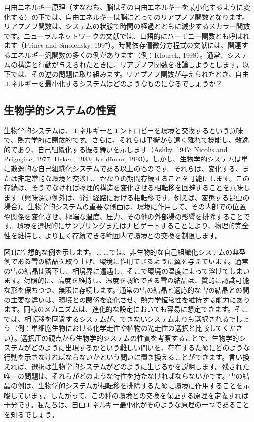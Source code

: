\documentclass{article}
\begin{document}
自由エネルギー原理（すなわち、脳はその自由エネルギーを最小化するように変化する）の下では、自由エネルギーは脳にとってのリアプノフ関数となります。リアプノフ関数は、システムの状態で時間の経過とともに減少するスカラー関数です。ニューラルネットワークの文献では、口語的にハーモニー関数とも呼ばれます（Prince and Smolensky, 1997）。時間依存偏微分方程式の文献には、関連するエネルギー汎関数の多くの例があります（例：Kloucek, 1998）。通常、システムの構造と行動が与えられたときに、リアプノフ関数を推論しようとします。以下では、その逆の問題に取り組みます。リアプノフ関数が与えられたとき、自由エネルギーを最小化するシステムはどのようなものになるでしょうか？

\subsection{生物学的システムの性質}
生物学的システムは、エネルギーとエントロピーを環境と交換するという意味で、熱力学的に開放的です。さらに、それらは平衡から遠く離れて機能し、散逸的であり、自己組織化する振る舞いを示します（Ashby, 1947; Nicolis and Prigogine, 1977; Haken, 1983; Kauffman, 1993）。しかし、生物学的システムは単に散逸的な自己組織化システムである以上のものです。それらは、変化する、または非定常的な環境と交渉し、かなりの期間存続することを可能にします。この存続は、そうでなければ物理的構造を変化させる相転移を回避することを意味します（興味深い例外は、発達経路における相転移です。例えば、変態する昆虫の場合）。生物学的システムの重要な側面は、環境に作用して、その内部での位置や関係を変化させ、極端な温度、圧力、その他の外部場の影響を排除することです。環境を選択的にサンプリングまたはナビゲートすることにより、物理的完全性を維持し、より長く存続できる範囲内で環境との交換を制限します。

図1に空想的な例を示します。ここでは、非生物的な自己組織化システムの典型例である雪の結晶を取り上げ、環境に作用できるように翼を与えています。通常の雪の結晶は落下し、相境界に遭遇し、そこで環境の温度によって溶けてしまいます。対照的に、高度を維持し、温度を調節できる雪の結晶は、質的に認識可能な形を保ちつつ、無限に存続します。通常の雪の結晶と適応的な雪の結晶との間の主要な違いは、環境との関係を変化させ、熱力学恒常性を維持する能力にあります。同様のメカニズムは、進化的な設定においても容易に想定できます。そこでは、相転移を回避するシステムが、できないシステムよりも選択されるでしょう（例：単細胞生物における化学走性や植物の光走性の選択と比較してください）。選択圧の観点から生物学的システムの性質を考察することで、生物学的システムがどのように出現するかという難しい問いを、存在するためにどのような行動を示さなければならないかという問いに置き換えることができます。言い換えれば、選択は生物学的システムがどのように生じるかを説明します。残された唯一の問題は、それらがどのような特性を持たなければならないかです。雪の結晶の例は、生物学的システムが相転移を排除するために環境に作用することを示唆しています。したがって、この種の環境との交換を保証する原理を定義すれば十分です。私たちは、自由エネルギー最小化がそのような原理の一つであることを知るでしょう。
\end{document}
